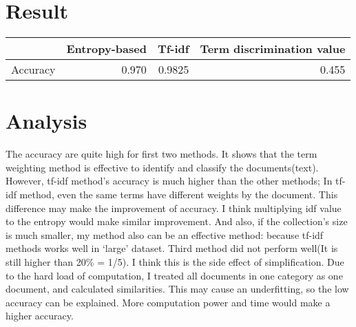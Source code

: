 \documentclass{article}
\begin{document}
\section{Result}

\begin{table}[!htbp]
\begin{tabular}{l|c|c|c}
                              & Entropy-based             & Tf-idf                     & Term discrimination value \\ \hline
\multicolumn{1}{r|}{Accuracy} & \multicolumn{1}{r|}{0.970} & \multicolumn{1}{r|}{0.9825} & \multicolumn{1}{r}{0.455}     
\end{tabular}
\end{table}

\section{Analysis}

The accuracy are quite high for first two methods.
It shows that the term weighting method is effective
to identify and classify the documents(text).
However, tf-idf method's accuracy is much higher than the other methods;
In tf-idf method, even the same terms have different weights by the document.
This difference may make the improvement of accuracy.
I think multiplying idf value to the entropy would make similar improvement.
And also, if the collection's size is much smaller,
my method also can be an effective method:
because tf-idf methods works well in `large' dataset.
Third method did not perform well(It is still higher than 20\% = 1/5). I think this is the side effect of simplification.
Due to the hard load of computation, I treated all documents in one category as one document, and calculated similarities.
This may cause an underfitting, so the low accuracy can be explained.
More computation power and time would make a higher accuracy.
\end{document}
